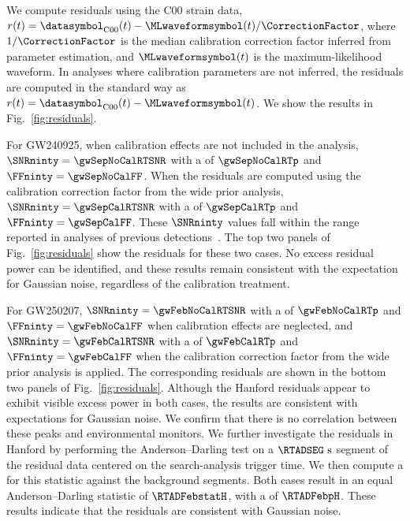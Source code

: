 We compute residuals using the \ac{C00} strain data, $r(t) = \datasymbol_{\mathrm{C00}}(t) - \MLwaveformsymbol(t)/\CorrectionFactor$, where $1/\CorrectionFactor$ is the median calibration correction factor inferred from parameter estimation, and $\MLwaveformsymbol(t)$ is the maximum-likelihood waveform.
In analyses where calibration parameters are not inferred, the residuals are computed in the standard way as $r(t) = \datasymbol_{\mathrm{C00}}(t) - \MLwaveformsymbol(t)$.
We show the results in Fig.~\ref{fig:residuals}.

For \ac{GW240925}, when calibration effects are not included in the analysis, $\SNRninty = \gwSepNoCalRTSNR$ with a \pvalue{} of $\gwSepNoCalRTp$ and $\FFninty = \gwSepNoCalFF$.
When the residuals are computed using the calibration correction factor from the wide prior analysis, $\SNRninty = \gwSepCalRTSNR$ with a \pvalue{} of $\gwSepCalRTp$ and $\FFninty = \gwSepCalFF$.
These $\SNRninty$ values fall within the range reported in analyses of previous detections~\cite{LIGOScientific:2026qni}.
The top two panels of Fig.~\ref{fig:residuals} show the residuals for these two cases.
No excess residual power can be identified, and these results remain consistent with the expectation for Gaussian noise, regardless of the calibration treatment.

For \ac{GW250207}, $\SNRninty = \gwFebNoCalRTSNR$ with a \pvalue{} of $\gwFebNoCalRTp$ and $\FFninty = \gwFebNoCalFF$ when calibration effects are neglected, and $\SNRninty = \gwFebCalRTSNR$ with a \pvalue{} of $\gwFebCalRTp$ and $\FFninty = \gwFebCalFF$ when the calibration correction factor from the wide prior analysis is applied.
The corresponding residuals are shown in the bottom two panels of Fig.~\ref{fig:residuals}.
Although the Hanford residuals appear to exhibit visible excess power in both cases, the results are consistent with expectations for Gaussian noise.
We confirm that there is no correlation between these peaks and environmental monitors.
We further investigate the residuals in Hanford by performing the Anderson--Darling test on a $\RTADSEG~\mathrm{s}$ segment of the residual data centered on the search-analysis trigger time.
We then compute a \pvalue{} for this statistic against the background segments.
Both cases result in an equal Anderson--Darling statistic of $\RTADFebstatH$, with a \pvalue{} of $\RTADFebpH$.
These results indicate that the residuals are consistent with Gaussian noise.


